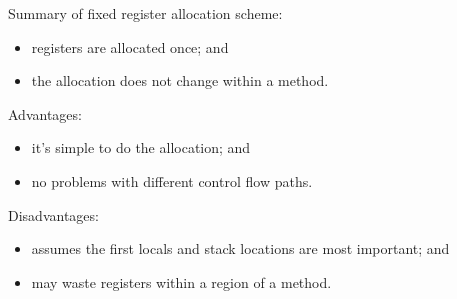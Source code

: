 \begin{slide*}
Summary of fixed register allocation scheme:

\begin{itemize}
\item registers are allocated once; and
\item the allocation does not change within a method.
\end{itemize}

Advantages:
\begin{itemize}
\item it's simple to do the allocation; and
\item no problems with different control flow paths.
\end{itemize}

Disadvantages:
\begin{itemize}
\item assumes the first locals and stack locations are most important; and
\item may waste registers within a region of a method.
\end{itemize}

\vfil
\end{slide*}
 
